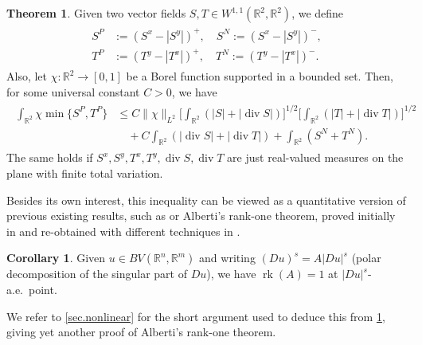 \documentclass[11pt,a4paper]{amsart}
\newcommand{\R}{\mathbb{R}}
\theoremstyle{definition}
\newtheorem{thm}[definition]{Theorem}
\newtheorem{corollary}[definition]{Corollary}
\DeclareMathOperator{\dive}{div}
\begin{document}
\begin{thm}\label{main.tw.intro}
	Given two vector fields $S,T\in W^{1,1}(\R^2,\R^2)$, we define
	\begin{align*}
		\begin{aligned}
		S^P&:=(S^x-|S^y|)^+,\quad S^N:=(S^x-|S^y|)^-, \\
		T^P&:=(T^y-|T^x|)^+,\quad T^N:=(T^y-|T^x|)^-.
		\end{aligned}
	\end{align*}
    Also, let $\chi:\R^2\to[0,1]$ be a Borel function supported in a bounded set. %
    Then, for some universal constant $C>0$, we have
	\begin{align}\label{kak.bis.intro}
        \begin{aligned}
		\int_{\R^2} \chi \min\{S^P,T^P\}
		&\le C\|\chi\|_{L^2}\Big[\int_{\R^2}(|S|+\lvert \dive S\rvert)\Big]^{1/2}\Big[\int_{\R^2}(|T|+\lvert \dive T\rvert)\Big]^{1/2} \\
		&\quad+C\int_{\R^2} (\lvert \dive S\rvert+\lvert \dive T\rvert)
        +\int_{\R^2}(S^N+T^N).
        \end{aligned}
	\end{align}
    The same holds if $S^x,S^y,T^x,T^y,\dive S,\dive T$ are just real-valued measures on the plane with finite total variation. %
\end{thm}

Besides its own interest, this inequality can be viewed as a quantitative
version of previous existing results, such as \cite[Proposition 8.6]{ACP} or Alberti's rank-one theorem,
proved initially in \cite{Alberti} and re-obtained with different techniques in \cite{DR,MV}.

\begin{corollary}
    Given $u\in BV(\R^n,\R^m)$ and writing $(Du)^s=A|Du|^s$ (polar decomposition of the singular part of $Du$), we have $\operatorname{rk}(A)=1$
    at $|Du|^s$-a.e.\ point.
\end{corollary}

We refer to \cref{sec.nonlinear} for the short argument used to deduce this from
\cref{main.tw.intro}, giving yet another proof of Alberti's rank-one theorem.
\end{document}
